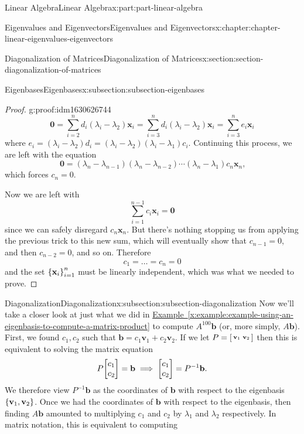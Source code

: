 \documentclass[twoside,10pt,]{book}
\newcommand{\xreffont}{\relax}
\numberwithin{equation}{part}
\providecommand{\vb}[1]{\mathbf{#1}}
\newcommand{\xx}{\mathbf{x}}
\newcommand{\vv}{\mathbf{v}}
\newcommand{\bb}{\mathbf{b}}
\begin{document}
\begin{partptx}{Linear Algebra}{}{Linear Algebra}{}{}{x:part:part-linear-algebra}
\begin{chapterptx}{Eigenvalues and Eigenvectors}{}{Eigenvalues and Eigenvectors}{}{}{x:chapter:chapter-linear-eigenvalues-eigenvectors}
\begin{sectionptx}{Diagonalization of Matrices}{}{Diagonalization of Matrices}{}{}{x:section:section-diagonalization-of-matrices}
\begin{subsectionptx}{Eigenbases}{}{Eigenbases}{}{}{x:subsection:subsection-eigenbases}
\begin{proof}{}{g:proof:idm1630626744}
\begin{equation*}
\vb{0} = \sum_{i=2}^n d_i (\lambda_i-\lambda_2)\xx_i = \sum_{i=3}^n d_i (\lambda_i-\lambda_2)\xx_i = \sum_{i=3}^n e_i\xx_i
\end{equation*}
where \(e_i = (\lambda_i-\lambda_2)d_i = (\lambda_i-\lambda_2)(\lambda_i-\lambda_1)c_i\). Continuing this process, we are left with the equation%
\begin{equation*}
\vb{0} = (\lambda_n-\lambda_{n-1})(\lambda_n-\lambda_{n-2})\cdots(\lambda_n-\lambda_1)c_n\xx_n\text{,}
\end{equation*}
which forces \(c_n = 0\).%
\par
Now we are left with%
\begin{equation*}
\sum_{i=1}^{n-1}c_{i}\xx_i = \vb{0}
\end{equation*}
since we can safely disregard \(c_n\xx_n\). But there's nothing stopping us from applying the previous trick to this new sum, which will eventually show that \(c_{n-1} = 0\), and then \(c_{n-2} = 0\), and so on. Therefore%
\begin{equation*}
c_1=\ldots = c_n = 0
\end{equation*}
and the set \(\qty{\xx_i}_{i=1}^n\) must be linearly independent, which was what we needed to prove.%
\end{proof}
\end{subsectionptx}
%
%
\typeout{************************************************}
\typeout{************************************************}
%
\begin{subsectionptx}{Diagonalization}{}{Diagonalization}{}{}{x:subsection:subsection-diagonalization}
Now we'll take a closer look at just what we did in \hyperref[x:example:example-using-an-eigenbasis-to-compute-a-matrix-product]{Example~{\xreffont\ref{x:example:example-using-an-eigenbasis-to-compute-a-matrix-product}}} to compute \(A^{100}\bb\) (or, more simply, \(A\bb\)). First, we found \(c_1,c_2\) such that \(\bb = c_1\vv_1 + c_2\vv_2\). If we let \(P = \smqty[\vv_1&\vv_2]\) then this is equivalent to solving the matrix equation%
\begin{equation*}
P\mqty[c_1 \\ c_2] = \bb\implies \mqty[c_1 \\ c_2] = P^{-1}\bb\text{.}
\end{equation*}
We therefore view \(P^{-1}\bb\) as the coordinates of \(\bb\) with respect to the eigenbasis \(\qty{\vv_1,\vv_2}\). Once we had the coordinates of \(\bb\) with respect to the eigenbasis, then finding \(A\bb\) amounted to multiplying \(c_1\) and \(c_2\) by \(\lambda_1\) and \(\lambda_2\) respectively. In matrix notation, this is equivalent to computing%

\end{subsectionptx}
\end{sectionptx}
\end{chapterptx}
\end{partptx}
\end{document}
